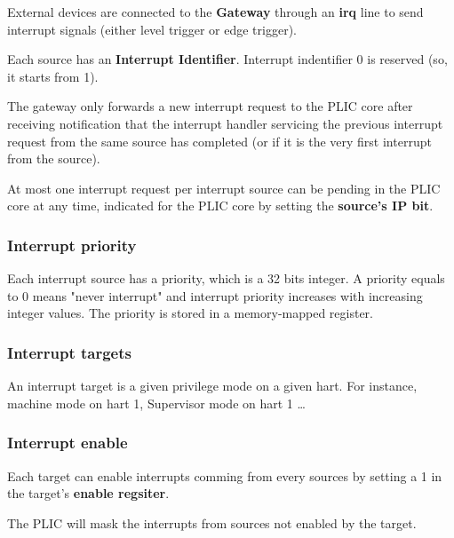 \documentclass[10pt, a4paper]{article}
\begin{document}
External devices are connected to the \textbf{Gateway} through an \textbf{irq} line to send interrupt signals (either level trigger or edge trigger). 

Each source has an \textbf{Interrupt Identifier}. Interrupt indentifier 0 is reserved (so, it starts from 1).


The gateway only forwards a new interrupt request to the PLIC core after receiving notification that the interrupt handler servicing the previous interrupt request from the same source has completed (or if it is the very first interrupt from the source).

At most one interrupt request per interrupt source can be pending in the PLIC core at any time, indicated for the PLIC core by setting the \textbf{source’s IP bit}.


\subsubsection{Interrupt priority}

Each interrupt source has a priority, which is a 32 bits integer.
A priority equals to 0 means "never interrupt" and  interrupt priority increases with increasing integer values. The priority is stored in a memory-mapped register.\\

\noindent {}

\subsubsection{Interrupt targets}

An interrupt target is a given privilege mode on a given hart.
For instance, machine mode on hart 1, Supervisor mode on hart 1 \dots{}


\subsubsection{Interrupt enable}

Each target can enable interrupts comming from every sources by setting a 1 in the target's \textbf{enable regsiter}.

The PLIC will mask the interrupts from sources not enabled by the target.\\
\end{document}
